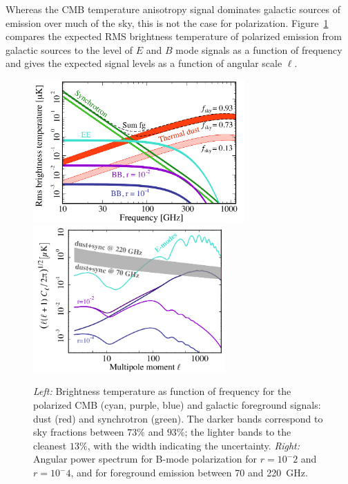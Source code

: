 Whereas the CMB temperature anisotropy signal dominates galactic sources
of emission over much of the sky, this is not the case for polarization. 
Figure~\ref{fig:frequency} compares the expected RMS brightness temperature 
of polarized emission from galactic sources to the level of $E$ and $B$ mode signals
as a function of frequency and gives the expected signal levels as a function of angular scale $\ell$.  
\begin{figure}[ht!]
\hspace{-0.2in}
\begin{center}
\includegraphics[width=3.2in]{Figures/overview_pol_v4_fsky_noplanck.pdf}
\includegraphics[width=2.9in]{Figures/cmb_vs_foreground.pdf}
\end{center}
\vspace{-0.25in}
\caption{\small \setlength{\baselineskip}{0.95\baselineskip}
{\it Left:} Brightness temperature as function of frequency for the polarized CMB (cyan, purple, blue)
and galactic foreground signals: dust (red) and synchrotron (green). The darker bands correspond to
sky fractions between $73\%$ and $93\%$; the lighter bands to the cleanest $13\%$, with the width 
indicating the uncertainty. {\it Right:} Angular power spectrum for B-mode polarization for $r=10^-2$ and $r=10^-4$, and for foreground emission between 70 and 220~GHz.}
\label{fig:frequency}
\vspace{-0.05in}
\end{figure}

